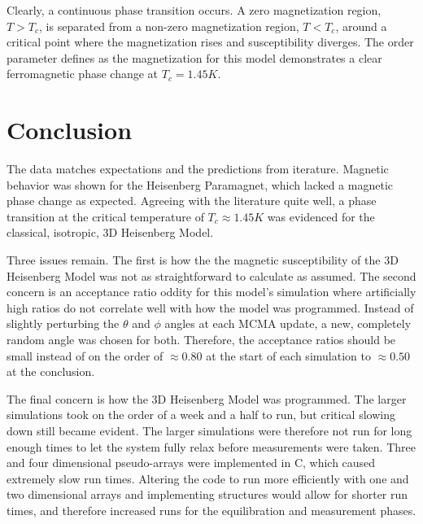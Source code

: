 \documentclass[a4paper,12pt]{article}
\begin{document}
		Clearly, a continuous phase transition occurs. A zero magnetization region, $T > T_c$, is separated from a non-zero magnetization region, $T < T_c$, around a critical point where the magnetization rises and susceptibility diverges. The order parameter defines as the magnetization for this model demonstrates  a clear ferromagnetic phase change at $T_c = 1.45 K$.


\section{Conclusion}
The data matches expectations and the predictions from iterature. Magnetic behavior was shown for the Heisenberg Paramagnet, which lacked a magnetic phase change as expected. Agreeing with the literature quite well, a phase transition at the critical temperature of $T_c \approx 1.45 K$ was evidenced for the classical, isotropic, 3D Heisenberg Model.

Three issues remain. The first is how the the magnetic susceptibility of the 3D Heisenberg Model was not as straightforward to calculate as assumed. The second concern is an acceptance ratio oddity for this model's simulation where artificially high ratios do not correlate well with how the model was programmed. Instead of slightly perturbing the $\theta$ and $\phi$ angles at each MCMA update, a new, completely random angle was chosen for both. Therefore, the acceptance ratios should be small instead of on the order of $\approx0.80$ at the start of each simulation to $\approx0.50$ at the conclusion.

The final concern is how the 3D Heisenberg Model was programmed. The larger simulations took on the order of a week and a half to run, but critical slowing down still became evident. The larger simulations were therefore not run for long enough times to let the system fully relax before measurements were taken. Three and four dimensional pseudo-arrays were implemented in C, which caused extremely slow run times. Altering the code to run more efficiently with one and two dimensional arrays and implementing structures would allow for shorter run times, and therefore increased runs for the equilibration and measurement phases.
    
\end{document}

